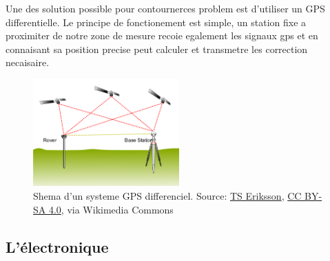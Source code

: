 Une des solution possible pour contournerces problem est d'utiliser un GPS differentielle. Le principe de fonctionement est simple, un station fixe a proximiter de notre zone de mesure recoie egalement les signaux gps et en connaisant sa position precise peut calculer et transmetre les correction necaisaire. \cite{site:GPS_diff}
\begin{figure}
    \centering
    \includegraphics[width=0.5\textwidth]{img/she/Real_time_kinematic.png}
    \caption[Shema d'un systeme GPS differenciel]{Shema d'un systeme GPS differenciel. Source: \href{https://commons.wikimedia.org/wiki/File:Real_time_kinematic.svg}{TS Eriksson}, \href{https://creativecommons.org/licenses/by-sa/4.0}{CC BY-SA 4.0}, via Wikimedia Commons}
    \label{fig:RTK}
\end{figure}

\subsection{L'électronique}

    